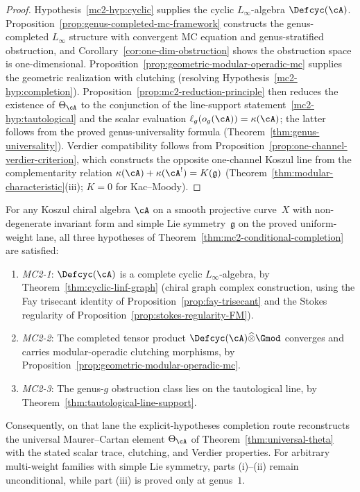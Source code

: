 \begin{proof}
Hypothesis~\ref{mc2-hyp:cyclic} supplies the cyclic
$L_\infty$-algebra $\Defcyc(\cA)$.
Proposition~\ref{prop:genus-completed-mc-framework} constructs the
genus-completed $L_\infty$ structure with convergent MC equation
and genus-stratified obstruction, and
Corollary~\ref{cor:one-dim-obstruction} shows the obstruction space
is one-dimensional.
Proposition~\ref{prop:geometric-modular-operadic-mc} supplies the
geometric realization with clutching
(resolving Hypothesis~\ref{mc2-hyp:completion}).
Proposition~\ref{prop:mc2-reduction-principle} then reduces the
existence of $\Theta_{\cA}$ to the conjunction of the line-support
statement~\ref{mc2-hyp:tautological} and the scalar evaluation
$\ell_g(o_g(\cA)) = \kappa(\cA)$; the latter follows from the
proved genus-universality formula
(Theorem~\ref{thm:genus-universality}).
Verdier compatibility follows from
Proposition~\ref{prop:one-channel-verdier-criterion}, which
constructs the opposite one-channel Koszul line from the
complementarity relation
$\kappa(\cA) + \kappa(\cA^!) = K(\mathfrak{g})$
(Theorem~\ref{thm:modular-characteristic}(iii);
$K = 0$ for Kac--Moody).
\end{proof}

\begin{theorem}
\label{thm:mc2-full-resolution}
For any Koszul chiral algebra $\cA$ on a smooth projective
curve~$X$ with non-degenerate invariant form and simple Lie
symmetry~$\mathfrak{g}$ on the proved uniform-weight lane, all
three hypotheses of
Theorem~\textup{\ref{thm:mc2-conditional-completion}} are satisfied:
\begin{enumerate}[label=\textup{(\roman*)}]
\item \emph{MC2-1}: $\Defcyc(\cA)$ is a complete cyclic
  $L_\infty$-algebra, by
  Theorem~\textup{\ref{thm:cyclic-linf-graph}} \textup{(}chiral
  graph complex construction, using the Fay trisecant identity of
  Proposition~\textup{\ref{prop:fay-trisecant}} and the Stokes
  regularity of
  Proposition~\textup{\ref{prop:stokes-regularity-FM}}\textup{)}.
\item \emph{MC2-2}: The completed tensor product
  $\Defcyc(\cA) \widehat{\otimes} \Gmod$ converges and carries
  modular-operadic clutching morphisms, by
  Proposition~\textup{\ref{prop:geometric-modular-operadic-mc}}.
\item \emph{MC2-3}: The genus-$g$ obstruction class lies on the
  tautological line, by
  Theorem~\textup{\ref{thm:tautological-line-support}}.
\end{enumerate}
Consequently, on that lane the explicit-hypotheses completion route
reconstructs the universal Maurer--Cartan element
$\Theta_{\cA}$ of
Theorem~\textup{\ref{thm:universal-theta}} with the stated scalar
trace, clutching, and Verdier properties.  For arbitrary
multi-weight families with simple Lie symmetry, parts
\textup{(i)}--\textup{(ii)} remain unconditional, while part
\textup{(iii)} is proved only at genus~$1$.
\end{theorem}

